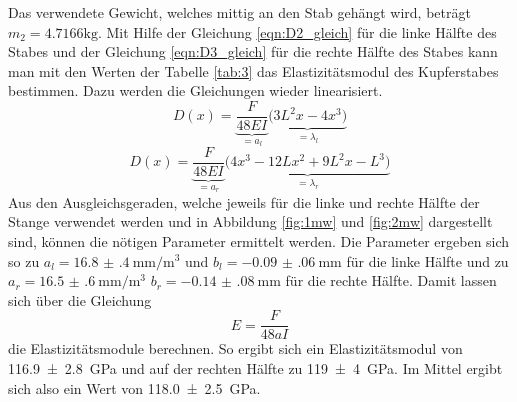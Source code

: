 Das verwendete Gewicht, welches mittig an den Stab gehängt wird, beträgt $m_2 = 4.7166 \si{\kilo\gram}$.
Mit Hilfe der Gleichung \eqref{eqn:D2_gleich} für die linke Hälfte des Stabes und der Gleichung \eqref{eqn:D3_gleich} für die rechte Hälfte des Stabes kann man mit den Werten der Tabelle \ref{tab:3} das Elastizitätsmodul des Kupferstabes bestimmen. Dazu werden die Gleichungen wieder linearisiert. 
\begin{equation*}
    D(x) = \underbrace{\frac{F}{48EI}}_{= a_l} \underbrace{\bigl( 3L^2 x -4x^3 \bigr)}_{= \lambda_l}
\end{equation*}
\begin{equation*}
    D(x) = \underbrace{\frac{F}{48EI}}_{= a_r} \underbrace{\bigl( 4x^3 - 12Lx^2 + 9L^2 x - L^3 \bigr)}_{= \lambda_r}
\end{equation*}
Aus den Ausgleichsgeraden, welche jeweils für die linke und rechte Hälfte der Stange verwendet werden und in Abbildung \ref{fig:1mw} und \ref{fig:2mw} dargestellt sind, können die nötigen Parameter ermittelt werden. 
Die Parameter ergeben sich so zu $a_l=\SI{16.8(4)}{\milli\m\per\cubic\m}$ und $b_l=\SI{-0.09(06)}{\milli\m}$ für die linke Hälfte und zu $a_r=\SI{16.5(6)}{\milli\m\per\cubic\m}$ $b_r=\SI{-0.14(08)}{\milli\m}$ für die rechte Hälfte.
Damit lassen sich über die Gleichung
\begin{equation*}
    E=\frac{F}{48aI}
\end{equation*}
die Elastizitätsmodule berechnen.
So ergibt sich ein Elastizitätsmodul von \SI{116.9(28)}{\giga\pascal} und auf der rechten Hälfte zu \SI{119(4)}{\giga\pascal}.
Im Mittel ergibt sich also ein Wert von \SI{118.0(25)}{\giga\pascal}.





